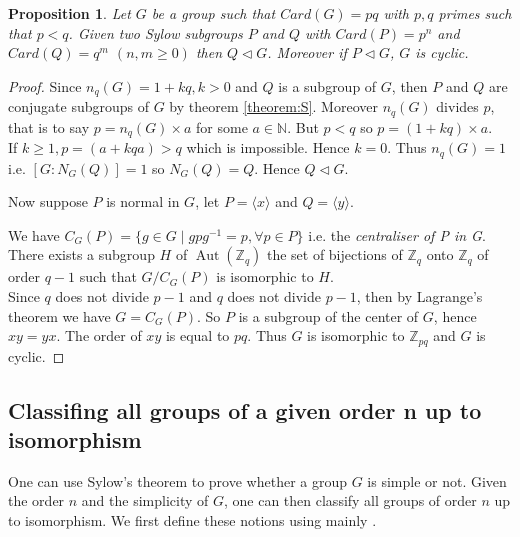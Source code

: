 \documentclass{article}
\theoremstyle{definition}
\theoremstyle{plain}
\newtheorem{proposition}[subsubsection]{Proposition}
\theoremstyle{plain}
\theoremstyle{plain}
\theoremstyle{plain}
\theoremstyle{definition}
\theoremstyle{plain}
\theoremstyle{plain}
\DeclareMathOperator{\Aut}{Aut} %
\begin{document}
\begin{proposition}\label{primes}
	Let \( G \) be a group such that \( Card(G) = pq \) with \( p,q \) primes such that \( p < q \). Given two Sylow subgroups \( P \) and \( Q \) with \( Card(P) = p^{n} \) and \( Card(Q) = q^{m} \) \( (n, m \geq 0) \) then \( Q \triangleleft G \). 
	Moreover if \( P \triangleleft G \), \( G \) is cyclic.
\end{proposition}

\begin{proof}
	Since \( n_q(G) = 1 + kq, k > 0 \) and \( Q \) is a subgroup of \( G \), then \( P \) and \( Q \) are conjugate subgroups of \( G \) by theorem \ref{theorem:S}. Moreover \( n_q(G) \) divides \( p \), that is to say \( p = n_q(G) \times a \) for some \( a \in \mathbb{N} \).
	But \( p < q \) so \( p = (1 + kq)\times a \). \\
	If \( k \geq 1, p = (a + kqa) > q \) which is impossible. Hence \( k = 0 \).
	Thus \( n_q(G) = 1 \) i.e. \( [G : N_G(Q)] = 1 \) so \( N_G(Q) = Q \).
	Hence \( Q \triangleleft G \). 

	Now suppose \( P \) is normal in \( G \), let \( P = \langle x \rangle \) and \( Q = \langle y \rangle \).

	We have \( C_G(P) = \{ g \in G \mid gpg^{-1} = p, \forall p \in P\} \) i.e. the \textit{centraliser of P in G}.
	There exists a subgroup \( H \) of \( \Aut({\mathbb{Z}_{q}}) \) the set of bijections of \( \mathbb{Z}_{q} \) onto \( \mathbb{Z}_{q} \) of order \( q-1 \) such that \( G/C_G(P) \) is isomorphic to \( H \). \\
	Since \( q \) does not divide \( p-1 \) and \( q \) does not divide \( p-1 \), then by Lagrange's theorem we have \( G = C_G(P) \). 
	So \( P \) is a subgroup of the center of \( G \), hence \( xy = yx \). The order of
	\( xy \) is equal to \( pq \).
	Thus \( G \) is isomorphic to \( \mathbb{Z}_{pq} \) and \( G \) is cyclic.
\end{proof}

\subsection{Classifing all groups of a given order n up to isomorphism}

\par One can use Sylow's theorem to prove whether a group \( G \) is simple or not. Given the order \( n \) and the simplicity of \( G \), one can then classify all groups of order \( n \) up to isomorphism. We first define these notions using mainly \cite[p.~103]{dummit2003abstract}.
\end{document}
